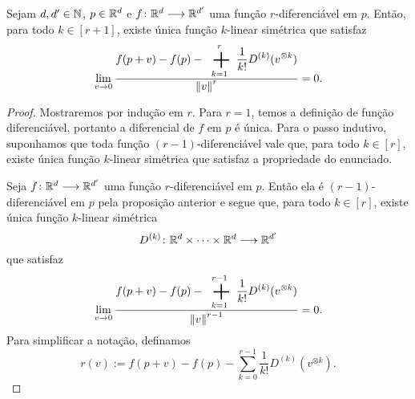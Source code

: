 \begin{proposition}
Sejam $d,d' \in \mathbb{N}$, $p \in \mathbb{R}^d$ e ${f}\colon {\mathbb{R}^d} \longrightarrow {\mathbb{R}^{d'}}$ uma função $r$-diferenciável em $p$. Então, para todo $k \in [r+1]$, existe única função $k$-linear simétrica que satisfaz
	\begin{equation*}
	\lim_{v \conv 0} \frac{\displaystyle f(p+v)-f(p)- \sum_{k=1}^r \frac{1}{k!} D^{(k)}(v^{\otimes k})}{\nor{v}^r} = 0.
	\end{equation*}
\end{proposition}
\begin{proof}
Mostraremos por indução em $r$. Para $r=1$, temos a definição de função diferenciável, portanto a diferencial de $f$ em $p$ é única. Para o passo indutivo, suponhamos que toda função $(r-1)$-diferenciável vale que, para todo $k \in [r]$, existe única função $k$-linear simétrica que satisfaz a propriedade do enunciado.

Seja ${f}\colon {\mathbb{R}^d} \longrightarrow {\mathbb{R}^{d'}}$ uma função $r$-diferenciável em $p$. Então ela é $(r-1)$-diferenciável em $p$ pela proposição anterior e segue que, para todo $k \in [r]$, existe única função $k$-linear simétrica
	\begin{equation*}
	{D^{(k)}}\colon {\mathbb{R}^d \times \cdots \times \mathbb{R}^d} \longrightarrow {\mathbb{R}^{d'}}
	\end{equation*}
que satisfaz
	\begin{equation*}
	\lim_{v \conv 0} \frac{\displaystyle f(p+v)-f(p)- \sum_{k=1}^{r-1} \frac{1}{k!}D^{(k)}(v^{\otimes k})}{\nor{v}^{r-1}} = 0.
	\end{equation*}
Para simplificar a notação, definamos
	\begin{equation*}
	r(v) := f(p+v)-f(p)-\sum_{k=0}^{r-1} \frac{1}{k!}D^{(k)}(v^{\otimes k}).
	\end{equation*}


\end{proof}
